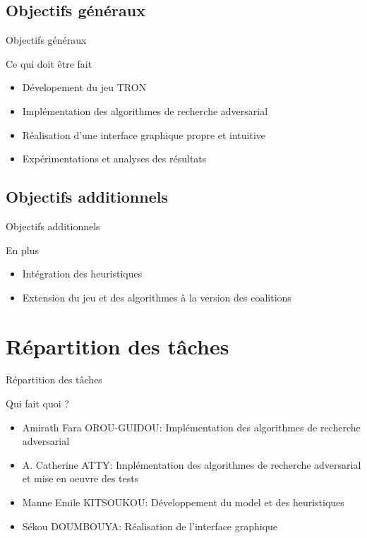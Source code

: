 \documentclass{beamer}
\begin{document}
    \subsection*{Objectifs généraux}
    \begin{frame}{Objectifs généraux}
        \begin{block}{Ce qui doit être fait}
            \begin{itemize}
                \item Dévelopement du jeu TRON
                \item Implémentation des algorithmes de recherche adversarial
                \item Réalisation d'une interface graphique propre et intuitive
                \item Expérimentations et analyses des résultats
            \end{itemize}
        \end{block}
    \end{frame}
    \subsection*{Objectifs additionnels}
    \begin{frame}{Objectifs additionnels}
        \begin{block}{En plus}
            \begin{itemize}
                \item Intégration des heuristiques
                \item Extension du jeu et des algorithmes à la version des coalitions
            \end{itemize}
        \end{block}
    \end{frame}


    \section{Répartition des tâches}
    \begin{frame}{Répartition des tâches}
        \begin{block}{Qui fait quoi ?}
            \begin{itemize}
                \item Amirath Fara OROU-GUIDOU: Implémentation des algorithmes de recherche adversarial
                \item A. Catherine ATTY: Implémentation des algorithmes de recherche adversarial et mise en oeuvre des tests
                \item Manne Emile KITSOUKOU: Développement du model et des heuristiques
                \item Sékou DOUMBOUYA: Réalisation de l'interface graphique
            \end{itemize}
        \end{block}
    \end{frame}
\end{document}
